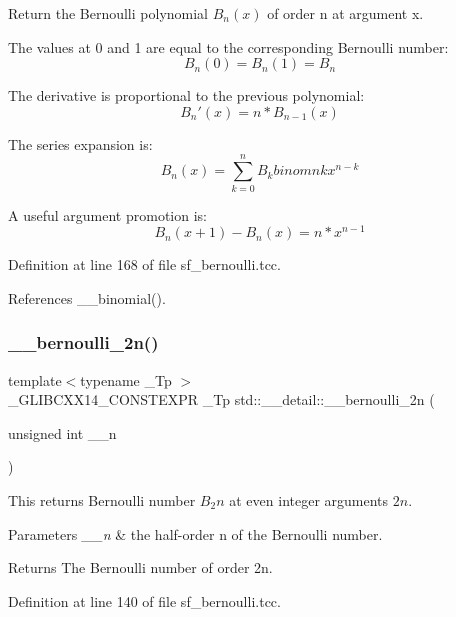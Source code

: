 Return the Bernoulli polynomial $ B_n(x) $ of order n at argument x.

The values at 0 and 1 are equal to the corresponding Bernoulli number\+: \[ B_n(0) = B_n(1) = B_n \]

The derivative is proportional to the previous polynomial\+: \[ B_n'(x) = n * B_{n-1}(x) \]

The series expansion is\+: \[ B_n(x) = \sum_{k=0}^{n} B_k binom{n}{k} x^{n-k} \]

A useful argument promotion is\+: \[ B_n(x+1) - B_n(x) = n * x^{n-1} \] 

Definition at line 168 of file sf\+\_\+bernoulli.\+tcc.



References \+\_\+\+\_\+binomial().

\mbox{\label{namespacestd_1_1____detail_abd0b1f05f2b32a21cad034b38473bb8b}} 
\subsubsection{\texorpdfstring{\+\_\+\+\_\+bernoulli\+\_\+2n()}{\_\_bernoulli\_2n()}}
{\footnotesize\ttfamily template$<$typename \+\_\+\+Tp $>$ \\
\+\_\+\+G\+L\+I\+B\+C\+X\+X14\+\_\+\+C\+O\+N\+S\+T\+E\+X\+PR \+\_\+\+Tp std\+::\+\_\+\+\_\+detail\+::\+\_\+\+\_\+bernoulli\+\_\+2n (\begin{DoxyParamCaption}\item[{unsigned int}]{\+\_\+\+\_\+n }\end{DoxyParamCaption})}



This returns Bernoulli number $ B_2n $ at even integer arguments $ 2n $. 


\begin{DoxyParams}{Parameters}
{\em \+\_\+\+\_\+n} & the half-\/order n of the Bernoulli number. \\
\hline
\end{DoxyParams}
\begin{DoxyReturn}{Returns}
The Bernoulli number of order 2n. 
\end{DoxyReturn}


Definition at line 140 of file sf\+\_\+bernoulli.\+tcc.

